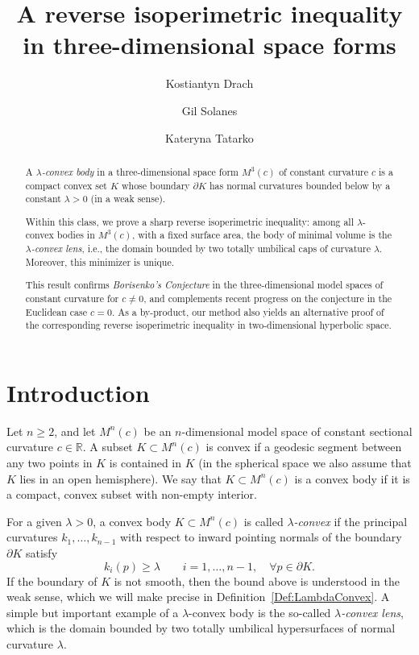 \documentclass[12pt]{amsart}
\title[A reverse isoperimetric inequality in space forms]{A reverse isoperimetric inequality in three-dimensional space forms}
\author[Kostiantyn Drach]{Kostiantyn Drach}
\author[Gil Solanes]{Gil Solanes}
\author[Kateryna Tatarko]{Kateryna Tatarko}
\date{}
\newcommand{\R}{\mathbb{R}}
\renewcommand{\ge}{\geqslant}
\theoremstyle{theorem}
\theoremstyle{Intro}
\theoremstyle{definition}
\theoremstyle{remark}
\theoremstyle{claim}
\numberwithin{equation}{section}
\begin{document}
\begin{abstract}
A \emph{$\lambda$-convex body} in a three-dimensional space form $M^3(c)$ of constant curvature $c$ is a compact convex set $K$ whose boundary $\partial K$ has normal curvatures bounded below by a constant $\lambda>0$ (in a weak sense).

Within this class, we prove a sharp reverse isoperimetric inequality: among all $\lambda$-convex bodies in $M^3(c)$, with a fixed surface area, the body of minimal volume is the \emph{$\lambda$-convex lens}, i.e., the domain bounded by two totally umbilical caps of curvature $\lambda$. Moreover, this minimizer is unique.

This result confirms \emph{Borisenko’s Conjecture} in the three-dimensional model spaces of constant curvature for $c\neq 0$, and complements recent progress on the conjecture in the Euclidean case $c=0$. As a by-product, our method also yields an alternative proof of the corresponding reverse isoperimetric inequality in two-dimensional hyperbolic space.
\end{abstract}


\maketitle


\section{Introduction}





 Let $n \ge 2$, and let $M^n(c)$ be an $n$-dimensional model space of constant sectional curvature $c \in \R$. A subset $K \subset M^n(c)$ is convex if a geodesic segment between any two points in $K$ is contained in $K$ (in the spherical space we also assume that $K$ lies in an open hemisphere). We say that $K \subset M^n(c)$ is a convex body if it is a compact, convex subset with non-empty interior. 
 
 For a given $\lambda > 0$, a convex body $K \subset M^n(c)$ is called \emph{$\lambda$-convex} if the principal curvatures $k_1,\ldots,k_{n-1}$ with respect to inward pointing normals of the boundary $\partial K$ satisfy
\[
k_i(p) \ge \lambda \qquad i=1,\ldots,n-1,\quad \forall p \in \partial K.
\]
If the boundary of $K$ is not smooth, then the bound above is understood in the weak sense, which we will make precise in Definition~\ref{Def:LambdaConvex}. A simple but important example of a $\lambda$-convex body is the so-called {\em $\lambda$-convex lens}, which is the domain bounded by two totally umbilical hypersurfaces of normal curvature $\lambda$.
\end{document}
